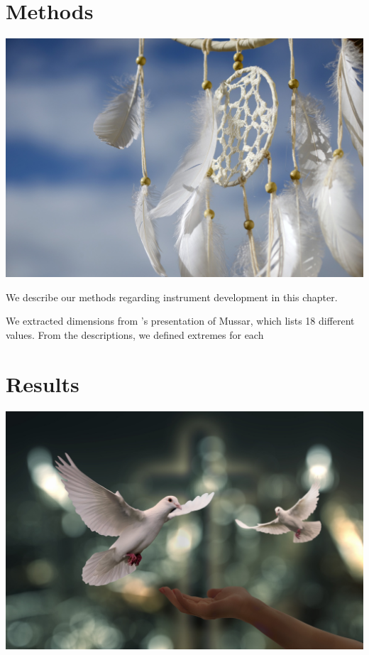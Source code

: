 \documentclass[
]{book}
\begin{document}
\hypertarget{methods}{%
\chapter{Methods}\label{methods}}

\includegraphics{dream-catcher-g6ec41bb43_1920.jpg}

We describe our methods regarding instrument development in this chapter.

We extracted dimensions from \citet{morinis2008everyday}'s presentation of Mussar, which lists 18 different values. From the descriptions, we defined extremes for each

\hypertarget{results}{%
\chapter{Results}\label{results}}

\includegraphics{doves-g750d44923_1920.jpg}
\end{document}
